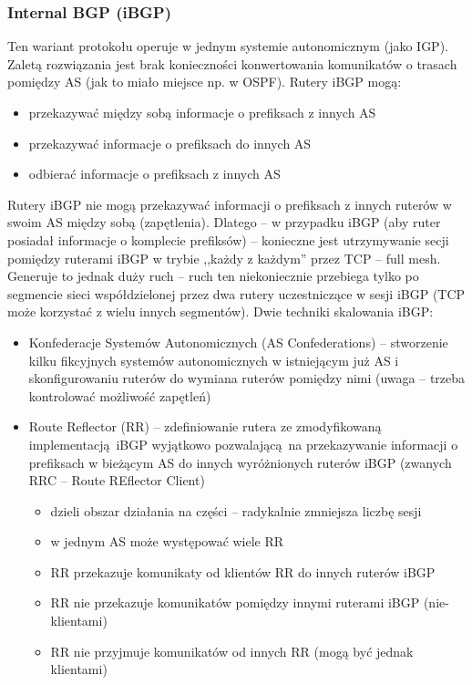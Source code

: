 \documentclass[a4paper, 12pt, titlepage]{article}
\begin{document}
			\subsubsection{Internal BGP (iBGP)}
				Ten wariant protokołu operuje w jednym systemie autonomicznym (jako IGP). Zaletą rozwiązania jest brak konieczności konwertowania komunikatów o trasach pomiędzy AS (jak to miało miejsce np. w OSPF).
				\newline
				\newline
				Rutery iBGP mogą:
				\begin{itemize}
					\item przekazywać między sobą informacje o prefiksach z innych AS
					\item przekazywać informacje o prefiksach do innych AS
					\item odbierać informacje o prefiksach z innych AS
				\end{itemize}	
				Rutery iBGP nie mogą przekazywać informacji o prefiksach z innych ruterów w swoim AS między sobą (zapętlenia). Dlatego -- w przypadku iBGP (aby ruter posiadał informacje o komplecie prefiksów) -- konieczne jest utrzymywanie secji pomiędzy ruterami iBGP w trybie ,,każdy z każdym'' przez TCP -- full mesh. Generuje to jednak duży ruch -- ruch ten niekoniecznie przebiega tylko po segmencie sieci współdzielonej przez dwa rutery uczestniczące w sesji iBGP (TCP może korzystać z wielu innych segmentów).
				\newline \newline 
				Dwie techniki skalowania iBGP:
				\begin{itemize}
					\item Konfederacje Systemów Autonomicznych (AS Confederations) -- stworzenie kilku fikcyjnych systemów autonomicznych w istniejącym już AS i skonfigurowaniu ruterów do wymiana ruterów pomiędzy nimi (uwaga -- trzeba kontrolować możliwość zapętleń)
					\item Route Reflector (RR) -- zdefiniowanie rutera ze zmodyfikowaną implementacją iBGP wyjątkowo pozwalającą na przekazywanie informacji o prefiksach w bieżącym AS do innych wyróżnionych ruterów iBGP (zwanych RRC -- Route REflector Client)
					\begin{itemize}
						\item dzieli obszar działania na części -- radykalnie zmniejsza liczbę sesji
						\item w jednym AS może występować wiele RR
						\item RR przekazuje komunikaty od klientów RR do innych ruterów iBGP
						\item RR nie przekazuje komunikatów pomiędzy innymi ruterami iBGP (nie-klientami)
						\item RR nie przyjmuje komunikatów od innych RR (mogą być jednak klientami)
					\end{itemize}
				\end{itemize}
\end{document}
